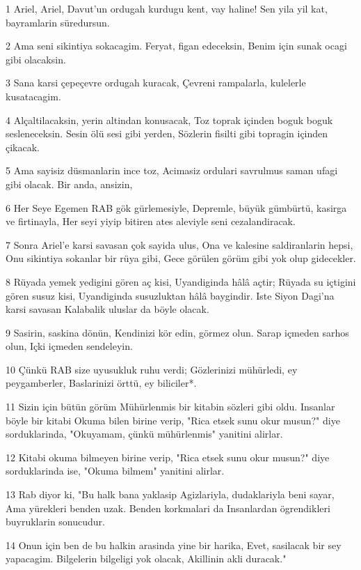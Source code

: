 \par 1 Ariel, Ariel, Davut'un ordugah kurdugu kent, vay haline! Sen yila yil kat, bayramlarin süredursun.
\par 2 Ama seni sikintiya sokacagim. Feryat, figan edeceksin, Benim için sunak ocagi gibi olacaksin.
\par 3 Sana karsi çepeçevre ordugah kuracak, Çevreni rampalarla, kulelerle kusatacagim.
\par 4 Alçaltilacaksin, yerin altindan konusacak, Toz toprak içinden boguk boguk sesleneceksin. Sesin ölü sesi gibi yerden, Sözlerin fisilti gibi topragin içinden çikacak.
\par 5 Ama sayisiz düsmanlarin ince toz, Acimasiz ordulari savrulmus saman ufagi gibi olacak. Bir anda, ansizin,
\par 6 Her Seye Egemen RAB gök gürlemesiyle, Depremle, büyük gümbürtü, kasirga ve firtinayla, Her seyi yiyip bitiren ates aleviyle seni cezalandiracak.
\par 7 Sonra Ariel'e karsi savasan çok sayida ulus, Ona ve kalesine saldiranlarin hepsi, Onu sikintiya sokanlar bir rüya gibi, Gece görülen görüm gibi yok olup gidecekler.
\par 8 Rüyada yemek yedigini gören aç kisi, Uyandiginda hâlâ açtir; Rüyada su içtigini gören susuz kisi, Uyandiginda susuzluktan hâlâ baygindir. Iste Siyon Dagi'na karsi savasan Kalabalik uluslar da böyle olacak.
\par 9 Sasirin, saskina dönün, Kendinizi kör edin, görmez olun. Sarap içmeden sarhos olun, Içki içmeden sendeleyin.
\par 10 Çünkü RAB size uyusukluk ruhu verdi; Gözlerinizi mühürledi, ey peygamberler, Baslarinizi örttü, ey biliciler*.
\par 11 Sizin için bütün görüm Mühürlenmis bir kitabin sözleri gibi oldu. Insanlar böyle bir kitabi Okuma bilen birine verip, "Rica etsek sunu okur musun?" diye sorduklarinda, "Okuyamam, çünkü mühürlenmis" yanitini alirlar.
\par 12 Kitabi okuma bilmeyen birine verip, "Rica etsek sunu okur musun?" diye sorduklarinda ise, "Okuma bilmem" yanitini alirlar.
\par 13 Rab diyor ki, "Bu halk bana yaklasip Agizlariyla, dudaklariyla beni sayar, Ama yürekleri benden uzak. Benden korkmalari da Insanlardan ögrendikleri buyruklarin sonucudur.
\par 14 Onun için ben de bu halkin arasinda yine bir harika, Evet, sasilacak bir sey yapacagim. Bilgelerin bilgeligi yok olacak, Akillinin akli duracak."
